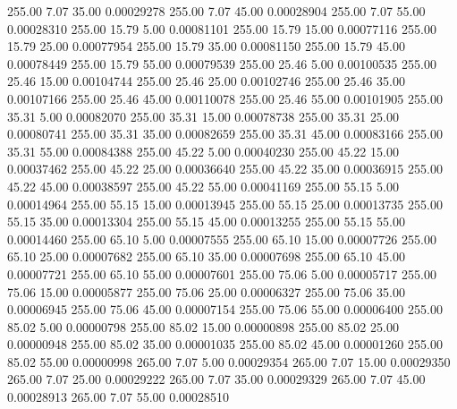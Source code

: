     255.00      7.07     35.00     0.00029278
    255.00      7.07     45.00     0.00028904
    255.00      7.07     55.00     0.00028310
    255.00     15.79      5.00     0.00081101
    255.00     15.79     15.00     0.00077116
    255.00     15.79     25.00     0.00077954
    255.00     15.79     35.00     0.00081150
    255.00     15.79     45.00     0.00078449
    255.00     15.79     55.00     0.00079539
    255.00     25.46      5.00     0.00100535
    255.00     25.46     15.00     0.00104744
    255.00     25.46     25.00     0.00102746
    255.00     25.46     35.00     0.00107166
    255.00     25.46     45.00     0.00110078
    255.00     25.46     55.00     0.00101905
    255.00     35.31      5.00     0.00082070
    255.00     35.31     15.00     0.00078738
    255.00     35.31     25.00     0.00080741
    255.00     35.31     35.00     0.00082659
    255.00     35.31     45.00     0.00083166
    255.00     35.31     55.00     0.00084388
    255.00     45.22      5.00     0.00040230
    255.00     45.22     15.00     0.00037462
    255.00     45.22     25.00     0.00036640
    255.00     45.22     35.00     0.00036915
    255.00     45.22     45.00     0.00038597
    255.00     45.22     55.00     0.00041169
    255.00     55.15      5.00     0.00014964
    255.00     55.15     15.00     0.00013945
    255.00     55.15     25.00     0.00013735
    255.00     55.15     35.00     0.00013304
    255.00     55.15     45.00     0.00013255
    255.00     55.15     55.00     0.00014460
    255.00     65.10      5.00     0.00007555
    255.00     65.10     15.00     0.00007726
    255.00     65.10     25.00     0.00007682
    255.00     65.10     35.00     0.00007698
    255.00     65.10     45.00     0.00007721
    255.00     65.10     55.00     0.00007601
    255.00     75.06      5.00     0.00005717
    255.00     75.06     15.00     0.00005877
    255.00     75.06     25.00     0.00006327
    255.00     75.06     35.00     0.00006945
    255.00     75.06     45.00     0.00007154
    255.00     75.06     55.00     0.00006400
    255.00     85.02      5.00     0.00000798
    255.00     85.02     15.00     0.00000898
    255.00     85.02     25.00     0.00000948
    255.00     85.02     35.00     0.00001035
    255.00     85.02     45.00     0.00001260
    255.00     85.02     55.00     0.00000998
    265.00      7.07      5.00     0.00029354
    265.00      7.07     15.00     0.00029350
    265.00      7.07     25.00     0.00029222
    265.00      7.07     35.00     0.00029329
    265.00      7.07     45.00     0.00028913
    265.00      7.07     55.00     0.00028510
